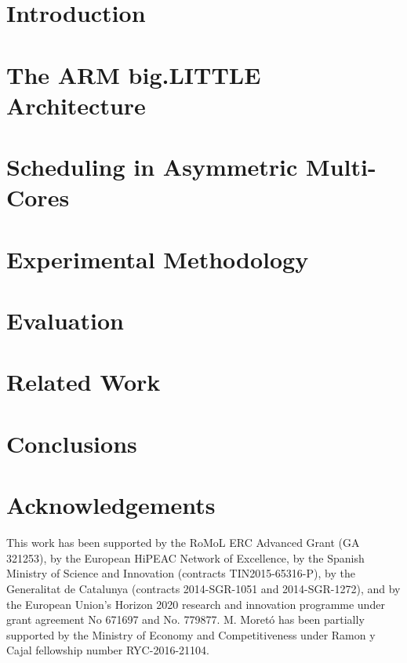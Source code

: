 \documentclass[preprint,12pt]{elsarticle}
\begin{document}



\section{Introduction}
\label{sec:intro}



\section{The ARM big.LITTLE Architecture}
\label{sec:background}\label{sec:suitability}


\section{Scheduling in Asymmetric Multi-Cores}
\label{sec:scheduling}


\section{Experimental Methodology}
\label{sec:experimental}


\section{Evaluation}
\label{sec:evaluation}


\section{Related Work}
\label{sec:related}


\section{Conclusions}
\label{sec:conclusions}


\section*{Acknowledgements}
This work has been supported by the RoMoL ERC Advanced Grant (GA 321253), by the European HiPEAC Network of Excellence, by the Spanish Ministry of Science and Innovation (contracts TIN2015-65316-P), by the Generalitat de Catalunya (contracts 2014-SGR-1051 and 2014-SGR-1272), and by the European Union's Horizon 2020 research and innovation programme under grant agreement No 671697 and No. 779877.
M. Moret\'{o} has been partially supported by the Ministry of Economy and Competitiveness under Ramon y Cajal fellowship number RYC-2016-21104.
\end{document}
